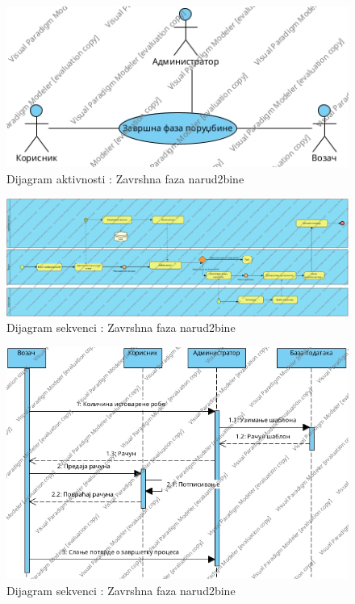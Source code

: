 \begin{figure}[h!]
	\includegraphics[scale=0.4]{Slike/UML/SUzavrsnaFazaPorudzbineUse Case Diagram.jpg}
	\centering
	\caption{Dijagram aktivnosti : Zavrshna faza narud2bine}
	\label{ucZavrsnaFazaAktivnost}
\end{figure}
\begin{figure}[h!]
	\includegraphics[scale=0.4]{Slike/BPMN/BPMNzavrsnaFazaPorudzbine.jpg}
	\centering
	\caption{Dijagram sekvenci : Zavrshna faza narud2bine}
	\label{ucZavrsnaFazaSekvence}
\end{figure}
\begin{figure}[h!]
	\includegraphics[scale=0.4]{Slike/DFD/SUzavrsnaFazaProudzbineSequence Diagram1.jpg}
	\centering
	\caption{Dijagram sekvenci : Zavrshna faza narud2bine}
	\label{ucZavrsnaFazaSekvence}
\end{figure}
